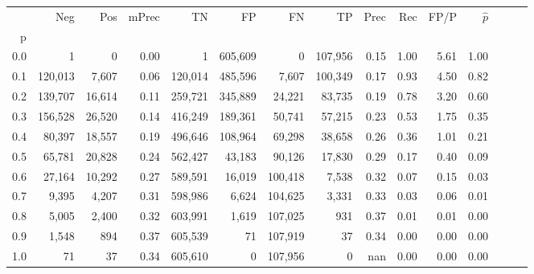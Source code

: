 \begin{tabular}{rrrrrrrrrrrrrrr}
\toprule
{} &      Neg &     Pos & mPrec &       TN &       FP &       FN &       TP &  Prec &   Rec &  FP/P & $\hat{p}$ \\
p   &          &         &       &          &          &          &          &       &       &       &           \\
\midrule
0.0 &        1 &       0 &  0.00 &        1 &  605,609 &        0 &  107,956 &  0.15 &  1.00 &  5.61 &      1.00 \\
0.1 &  120,013 &   7,607 &  0.06 &  120,014 &  485,596 &    7,607 &  100,349 &  0.17 &  0.93 &  4.50 &      0.82 \\
0.2 &  139,707 &  16,614 &  0.11 &  259,721 &  345,889 &   24,221 &   83,735 &  0.19 &  0.78 &  3.20 &      0.60 \\
0.3 &  156,528 &  26,520 &  0.14 &  416,249 &  189,361 &   50,741 &   57,215 &  0.23 &  0.53 &  1.75 &      0.35 \\
0.4 &   80,397 &  18,557 &  0.19 &  496,646 &  108,964 &   69,298 &   38,658 &  0.26 &  0.36 &  1.01 &      0.21 \\
0.5 &   65,781 &  20,828 &  0.24 &  562,427 &   43,183 &   90,126 &   17,830 &  0.29 &  0.17 &  0.40 &      0.09 \\
0.6 &   27,164 &  10,292 &  0.27 &  589,591 &   16,019 &  100,418 &    7,538 &  0.32 &  0.07 &  0.15 &      0.03 \\
0.7 &    9,395 &   4,207 &  0.31 &  598,986 &    6,624 &  104,625 &    3,331 &  0.33 &  0.03 &  0.06 &      0.01 \\
0.8 &    5,005 &   2,400 &  0.32 &  603,991 &    1,619 &  107,025 &      931 &  0.37 &  0.01 &  0.01 &      0.00 \\
0.9 &    1,548 &     894 &  0.37 &  605,539 &       71 &  107,919 &       37 &  0.34 &  0.00 &  0.00 &      0.00 \\
1.0 &       71 &      37 &  0.34 &  605,610 &        0 &  107,956 &        0 &   nan &  0.00 &  0.00 &      0.00 \\
\bottomrule
\end{tabular}
